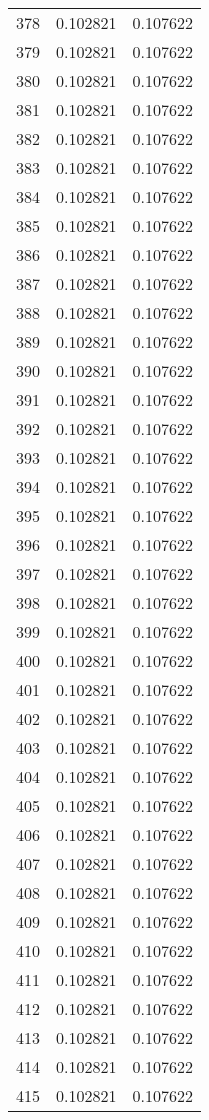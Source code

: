 \begin{longtable}{rrr}
378 & 0.102821 & 0.107622 \\
379 & 0.102821 & 0.107622 \\
380 & 0.102821 & 0.107622 \\
381 & 0.102821 & 0.107622 \\
382 & 0.102821 & 0.107622 \\
383 & 0.102821 & 0.107622 \\
384 & 0.102821 & 0.107622 \\
385 & 0.102821 & 0.107622 \\
386 & 0.102821 & 0.107622 \\
387 & 0.102821 & 0.107622 \\
388 & 0.102821 & 0.107622 \\
389 & 0.102821 & 0.107622 \\
390 & 0.102821 & 0.107622 \\
391 & 0.102821 & 0.107622 \\
392 & 0.102821 & 0.107622 \\
393 & 0.102821 & 0.107622 \\
394 & 0.102821 & 0.107622 \\
395 & 0.102821 & 0.107622 \\
396 & 0.102821 & 0.107622 \\
397 & 0.102821 & 0.107622 \\
398 & 0.102821 & 0.107622 \\
399 & 0.102821 & 0.107622 \\
400 & 0.102821 & 0.107622 \\
401 & 0.102821 & 0.107622 \\
402 & 0.102821 & 0.107622 \\
403 & 0.102821 & 0.107622 \\
404 & 0.102821 & 0.107622 \\
405 & 0.102821 & 0.107622 \\
406 & 0.102821 & 0.107622 \\
407 & 0.102821 & 0.107622 \\
408 & 0.102821 & 0.107622 \\
409 & 0.102821 & 0.107622 \\
410 & 0.102821 & 0.107622 \\
411 & 0.102821 & 0.107622 \\
412 & 0.102821 & 0.107622 \\
413 & 0.102821 & 0.107622 \\
414 & 0.102821 & 0.107622 \\
415 & 0.102821 & 0.107622 \\

\end{longtable}
